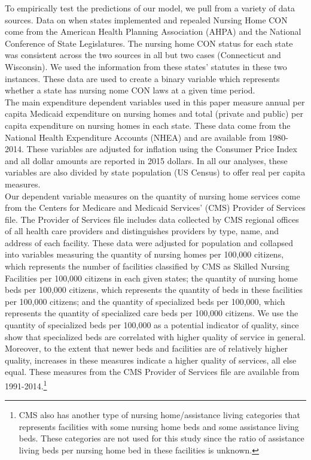 \documentclass[../Main.tex]{subfiles}
\begin{document}
To empirically test the predictions of our model, we pull from a variety of data sources. Data on when states implemented and repealed Nursing Home CON come from the American Health Planning Association (AHPA) and the National Conference of State Legislatures. The nursing home CON status for each state was consistent across the two sources in all but two cases (Connecticut and Wisconsin). We used the information from these states' statutes in these two instances. These data are used to create a binary variable which represents whether a state has nursing nome CON laws at a given time period.\\
\indent The main expenditure dependent variables used in this paper measure annual per capita Medicaid expenditure on nursing homes and total (private and public) per capita expenditure on nursing homes in each state. These data come from the National Health Expenditure Accounts (NHEA) and are available from 1980-2014. These variables are adjusted for inflation using the Consumer Price Index and all dollar amounts are reported in 2015 dollars. In all our analyses, these variables are also divided by state population (US Census) to offer real per capita measures.\\
\indent Our dependent variable measures on the quantity of nursing home services come from the Centers for Medicare and Medicaid Services’ (CMS) Provider of Services file. The Provider of Services file includes data collected by CMS regional offices of all health care providers and distinguishes providers by type, name, and address of each facility. These data were adjusted for population and collapsed into variables measuring the quantity of nursing homes per 100,000 citizens, which represents the number of facilities classified by CMS as Skilled Nursing Facilities per 100,000 citizens in each given states; the quantity of nursing home beds per 100,000 citizens, which represents the quantity of beds in these facilities per 100,000 citizens; and the quantity of specialized beds per 100,000, which represents the quantity of specialized care beds per 100,000 citizens. We use the quantity of specialized beds per 100,000 as a potential indicator of quality, since \citet{grabowski2010quality} show that specialized beds are correlated with higher quality of service in general. Moreover, to the extent that newer beds and facilities are of relatively higher quality, increases in these measures indicate a higher quality of services, all else equal. These measures from the CMS Provider of Services file are available from 1991-2014.\footnote{CMS also has another type of nursing home/assistance living categories that represents facilities with some nursing home beds and some assistance living beds. These categories are not used for this study since the ratio of assistance living beds per nursing home bed in these facilities is unknown.} \\
\end{document}
